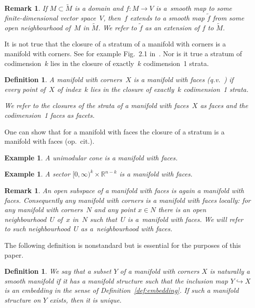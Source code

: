 \documentclass[10pt,a4paper]{amsart}
\numberwithin{equation}{section}
\newtheorem{Definition}[Lemma]{Definition}
\newtheorem{Example}[Lemma]{Example}
\newtheorem{Remark}[Lemma]{Remark}
\begin{document}
\begin{Remark} \label{rmrk:A9}
If $M\subset \tilde{M}$ is a domain and $f\colon M\to V$ is a~smooth map to some f\/inite-dimensional vector space~$V$, then~$f$
  extends to a smooth map $\tilde{f}$ from some open neighbourhood of~$M$ in $\tilde{M}$.
  We refer to
  $\tilde{f}$ as an {\em extension} of $f$ to $\tilde{M}$.
\end{Remark}

It is not true that the closure of a stratum of a manifold with corners
is a manifold with corners.  See for example Fig.~2.1 in~\cite{Joyce}.  Nor is it true a stratum
of codimension~$k$ lies in the closure of exactly~$k$ codimension~1
strata.


\begin{Definition} \label{def:faces} A manifold with corners~$X$ is a
{\em manifold with faces} (q.v.~\cite{Janich}) if every point of~$X$
of index~$k$ lies in the closure of exactly~$k$ codimension~1 strata.

We refer to the closures of the strata of a manifold with faces~$X$
as {\em faces} and
the codimension~1 faces as {\em facets.}
\end{Definition}

One can show that for a manifold with faces the
closure of a stratum is a manifold with faces (op.\ cit.).

\begin{Example} A unimodular cone is a manifold with faces.
\end{Example}

\begin{Example} A sector $[0,\infty)^k \times {\mathbb R}^{n-k}$ is a manifold
with faces.
\end{Example}

\begin{Remark}
  An open subspace of a manifold with faces is again a manifold with
  faces.  Consequently any manifold with corners is a manifold with
  faces locally: for any manifold with corners~$N$ and any point $x\in
  N$ there is an open neighbourhood~$U$ of~$x$ in~$N$ such that~$U$ is
  a~manifold with faces.  We will refer to such neighbourhood~$U$ as a~{\em neighbourhood with faces.}
\end{Remark}

The following def\/inition is nonstandard but is essential for the
purposes of this paper.

\begin{Definition} \label{submanifold}
  We say that a subset $Y$ of a manifold with corners $X$
  is \emph{naturally a smooth manifold}
  if it has a manifold structure such that the inclusion map
  $Y \hookrightarrow X$ is an embedding
  in the sense of Def\/inition~\ref{def:embedding}.
  If such a manifold structure on $Y$ exists, then it is unique.
\end{Definition}
\end{document}
